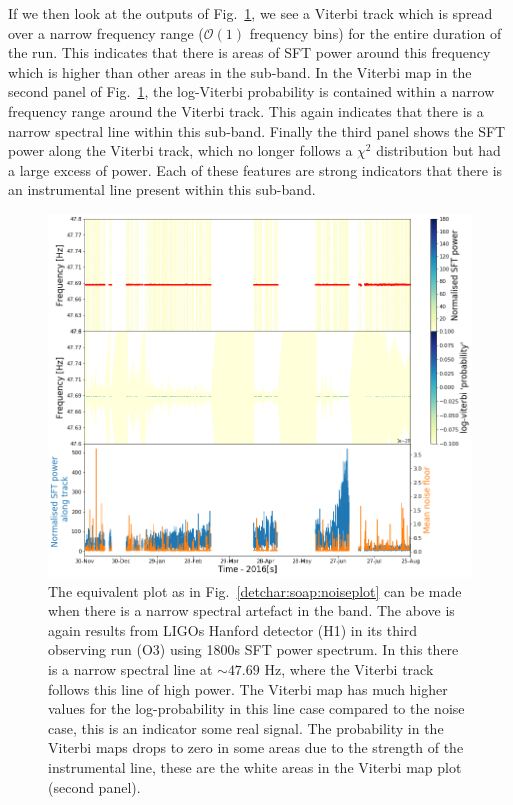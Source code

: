 If we then look at the outputs of Fig.~\ref{detchar:soap:lineplot}, we see a Viterbi track which is spread over a narrow frequency range ($\mathcal{O}(1)$ frequency bins) for the entire duration of the run.  
This indicates that there is areas of \gls{SFT} power around this frequency which is higher than other areas in the sub-band.
In the Viterbi map in the second panel of Fig.~\ref{detchar:soap:lineplot}, the log-Viterbi probability is contained within a narrow frequency range around the Viterbi track.
This again indicates that there is a narrow spectral line within this sub-band.
Finally the third panel shows the \gls{SFT} power along the Viterbi track, which no longer follows a $\chi^2$ distribution but had a large excess of power.
Each of these features are strong indicators that there is an instrumental line present within this sub-band.
%
\begin{figure}[hpt]
	\centering
	\includegraphics[width=\textwidth]{C6_detchar/track_F47_6_47_8_linenarrow.png}
	\caption[Example SOAP output for string narrow instrumental line.]{The equivalent plot as in Fig.~\ref{detchar:soap:noiseplot} can be made when there is a narrow spectral artefact in the band. The above is again results from \glspl{LIGO} Hanford detector (H1) in its third observing run (O3) using 1800s \gls{SFT} power spectrum. In this there is a narrow spectral line at $\sim 47.69$ Hz, where the Viterbi track follows this line of high power. The Viterbi map has much higher values for the log-probability in this line case compared to the noise case, this is an indicator some real signal. The probability in the Viterbi maps drops to zero in some areas due to the strength of the instrumental line, these are the white areas in the Viterbi map plot (second panel). }
	\label{detchar:soap:lineplot}
\end{figure}
%


